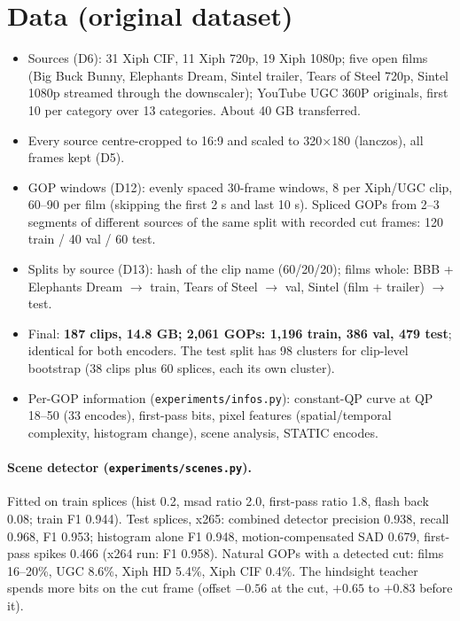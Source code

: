 \documentclass[10pt,a4paper]{article}
\newcommand{\code}[1]{\texttt{\small #1}}
\begin{document}
\section{Data (original dataset)}
\begin{itemize}
\item Sources (D6): 31 Xiph CIF, 11 Xiph 720p, 19 Xiph 1080p; five open films (Big Buck Bunny, Elephants Dream,
Sintel trailer, Tears of Steel 720p, Sintel 1080p streamed through the downscaler); YouTube UGC 360P originals, first
10 per category over 13 categories. About 40 GB transferred.
\item Every source centre-cropped to 16:9 and scaled to 320$\times$180 (lanczos), all frames kept (D5).
\item GOP windows (D12): evenly spaced 30-frame windows, 8 per Xiph/UGC clip, 60--90 per film (skipping the first 2 s
and last 10 s). Spliced GOPs from 2--3 segments of different sources of the same split with recorded cut frames:
120 train / 40 val / 60 test.
\item Splits by source (D13): hash of the clip name (60/20/20); films whole: BBB + Elephants Dream $\to$ train, Tears
of Steel $\to$ val, Sintel (film + trailer) $\to$ test.
\item Final: \textbf{187 clips, 14.8 GB; 2,061 GOPs: 1,196 train, 386 val, 479 test}; identical for both encoders.
The test split has 98 clusters for clip-level bootstrap (38 clips plus 60 splices, each its own cluster).
\item Per-GOP information (\code{experiments/infos.py}): constant-QP curve at QP 18--50 (33 encodes), first-pass bits,
pixel features (spatial/temporal complexity, histogram change), scene analysis, STATIC encodes.
\end{itemize}
\paragraph{Scene detector (\code{experiments/scenes.py}).} Fitted on train splices (hist 0.2, msad ratio 2.0, first-pass
ratio 1.8, flash back 0.08; train F1 0.944). Test splices, x265: combined detector precision 0.938, recall 0.968,
F1 0.953; histogram alone F1 0.948, motion-compensated SAD 0.679, first-pass spikes 0.466 (x264 run: F1 0.958).
Natural GOPs with a detected cut: films 16--20\%, UGC 8.6\%, Xiph HD 5.4\%, Xiph CIF 0.4\%. The hindsight teacher spends
more bits on the cut frame (offset $-0.56$ at the cut, $+0.65$ to $+0.83$ before it).

\end{document}
